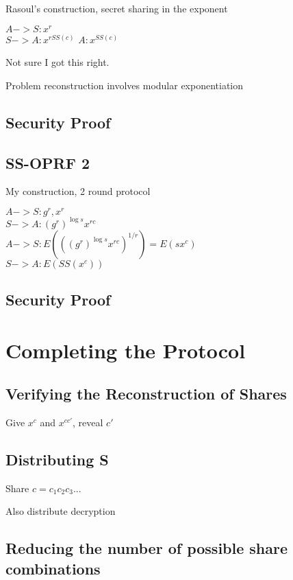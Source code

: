 \documentclass[10pt, sigconf]{acmart}
\begin{document}
Rasoul's construction, secret sharing in the exponent

$A -> S: x^r$ \\
$S -> A: x^{rSS(c)}$
$A: x^{SS(c)}$

Not sure I got this right.

Problem reconstruction involves modular exponentiation

\subsection{Security Proof}

\subsection{SS-OPRF 2}

My construction, 2 round protocol

$A -> S: g^r, x^r$ \\
$S -> A: (g^r)^{\log s} x^{rc}$ \\
$A -> S: E(((g^r)^{\log s} x^{rc})^{1/r}) = E(s x^c)$ \\
$S -> A: E(SS(x^c))$

\subsection{Security Proof}

\section{Completing the Protocol}

\subsection{Verifying the Reconstruction of Shares}

Give $x^c$ and $x^{cc'}$, reveal $c'$

\subsection{Distributing S}

Share $c = c_1 c_2 c_3 ...$

Also distribute decryption

\subsection{Reducing the number of possible share combinations}
\end{document}
